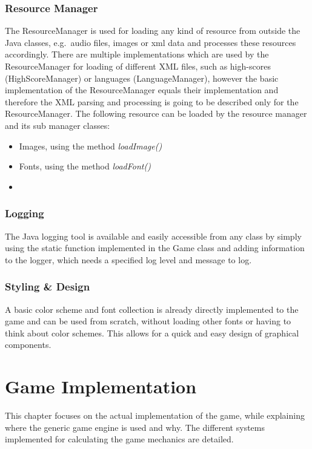 \subsubsection{Resource Manager}\label{subsubsec:resource-manager}
The ResourceManager is used for loading any kind of resource from outside the Java classes, e.g.\ audio files, images or xml data and processes
these resources accordingly.
There are multiple implementations which are used by the ResourceManager for loading of different XML files, such as high-scores (HighScoreManager) or languages (LanguageManager),
however the basic implementation of the ResourceManager equals their implementation and therefore the XML parsing and processing is going to be described only for the ResourceManager.
The following resource can be loaded by the resource manager and its sub manager classes:
\begin{itemize}
    \item Images, using the method \textit{loadImage()}
    \item Fonts, using the method \textit{loadFont()}
    \item
\end{itemize}
\subsubsection{Logging}\label{subsubsec:logging}
The Java logging tool is available and easily accessible from any class by simply using the static function implemented in the Game class and adding information to
the logger, which needs a specified log level and message to log.

\subsubsection{Styling \& Design}\label{subsubsec:styling-&-design}
A basic color scheme and font collection is already directly implemented to the game and can be used from scratch, without loading other fonts or having to think about
color schemes.
This allows for a quick and easy design of graphical components.

\section{Game Implementation}\label{sec:game-implementation}
This chapter focuses on the actual implementation of the game, while explaining where the generic game engine is used and why.
The different systems implemented for calculating the game mechanics are detailed.
